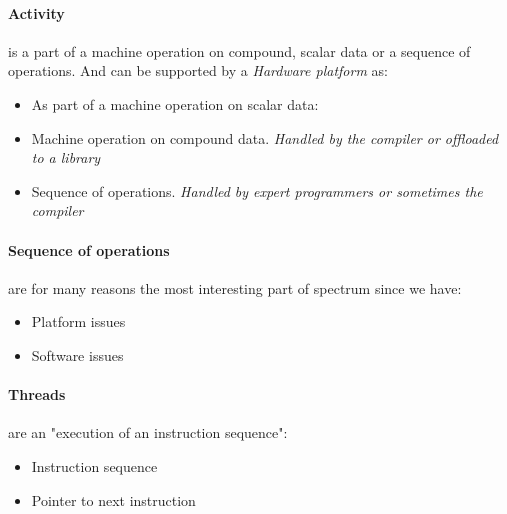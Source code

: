 \paragraph{Activity} is a part of a machine operation on compound, scalar data or a sequence of operations. And can be supported by a \emph{Hardware platform} as:
\begin{itemize}
\item As part of a machine operation on scalar data:
\item Machine operation on compound data. \emph{Handled by the compiler or offloaded to a library}
\item Sequence of operations. \emph{Handled by expert programmers or sometimes the compiler}
\end{itemize}

\paragraph{Sequence of operations} are for many reasons the most interesting part of spectrum since we have:
\begin{itemize}
	\item Platform issues
	\item Software issues
\end{itemize}

\paragraph{Threads} are an "execution of an instruction sequence":
\begin{itemize}
	\item Instruction sequence
	\item Pointer to next instruction
\end{itemize}

